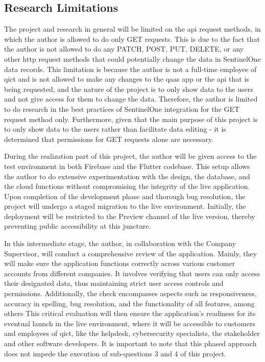 \subsection{Research Limitations}
The project and research in general will be limited on the \acrshort{api} request methods, in which the author
is allowed to do only GET requests. This is due to the fact that the author is not allowed to do any PATCH,
POST, PUT, DELETE, or any other \acrshort{http} request methods that could potentially change the data in SentinelOne data records.
This limitation is because the author is not a full-time employee of \acrshort{qict} and is not allowed to make any changes to the
\acrshort{qaas} app or the \acrshort{api} that is being requested, and the nature of the project is to only show data to the users and
not give access for them to change the data. Therefore, the author is limited to do research in the best practices of SentinelOne
integration for the GET request method only. Furthermore, given that the main purpose of this project is to only show data to the
users rather than facilitate data editing - it is determined that permissions for GET requests alone are necessary.

During the realization part of this project, the author will be given access to the test environment in both Firebase and the Flutter
codebase. This setup allows the author to do extensive experimentation with the design, the database, and the cloud functions without
compromising the integrity of the live application. Upon completion of the development phase and thorough bug resolution, the project
will undergo a staged migration to the live environment. Initially, the deployment will be restricted to the Preview channel of the live
version, thereby preventing public accessibility at this juncture.

In this intermediate stage, the author, in collaboration with the Company Supervisor, will conduct a comprehensive review of
the application. Mainly, they will make sure the application functions correctly across various customer accounts from different companies.
It involves verifying that users can only access their designated data, thus maintaining strict user access controls and permissions.
Additionally, the check encompasses aspects such as responsiveness, accuracy in spelling, bug resolution, and the functionality of all
features, among others This critical evaluation will then ensure the application's readiness for its eventual launch in the live
environment, where it will be accessible to customers and employees of \acrshort{qict}, like the helpdesk, cybersecurity specialists,
the stakeholder and other  software developers. It is important to note that this phased approach does not impede the execution of
sub-questions 3 and 4 of this project.

